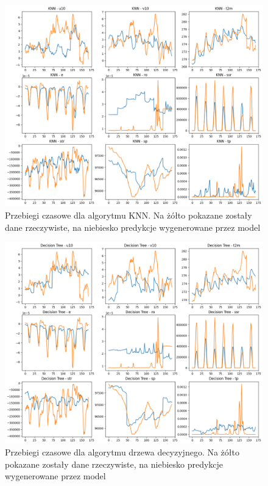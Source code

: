 \begin{figure}[H]
    \centering
    \includegraphics[width=\textwidth]{images/knn_week.png}
    \caption{Przebiegi czasowe dla algorytmu KNN. Na żółto pokazane zostały dane 
    rzeczywiste, na niebiesko predykcje wygenerowane przez model}
    \label{knn-week}
\end{figure}

\begin{figure}[H]
    \centering
    \includegraphics[width=\textwidth]{images/Decision_tree_week.png}
    \caption{Przebiegi czasowe dla algorytmu drzewa decyzyjnego. Na żółto pokazane zostały dane 
    rzeczywiste, na niebiesko predykcje wygenerowane przez model}
    \label{tree-week}
\end{figure}

